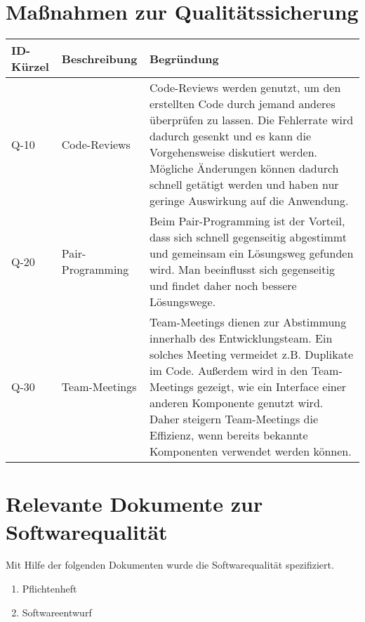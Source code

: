 \section{Maßnahmen zur Qualitätssicherung}
\begin{tabularx}{\textwidth}{|l|X|X|}
    \toprule
    \textbf{ID-Kürzel} & \textbf{Beschreibung} & \textbf{Begründung}\\
    \midrule
    \endhead
    \hline
    \caption{Qualitätssicherung}    
    \endfoot    
    Q-10 & Code-Reviews & Code-Reviews werden genutzt, um den erstellten Code durch jemand anderes überprüfen zu lassen. Die Fehlerrate wird 		dadurch gesenkt und es kann die Vorgehensweise diskutiert werden. Mögliche Änderungen können dadurch schnell getätigt werden und haben nur 		geringe Auswirkung auf die Anwendung.  \\ \hline
    Q-20 & Pair-Programming & Beim Pair-Programming ist der Vorteil, dass sich schnell gegenseitig abgestimmt und gemeinsam ein Lösungsweg  		gefunden wird. Man beeinflusst sich gegenseitig und findet daher noch bessere Lösungswege.\\ \hline
    Q-30 & Team-Meetings & Team-Meetings dienen zur Abstimmung innerhalb des Entwicklungsteam. Ein solches Meeting vermeidet z.B. Duplikate im 		Code. Außerdem wird in den Team-Meetings gezeigt, wie ein Interface einer anderen Komponente genutzt wird. Daher steigern Team-Meetings die 	Effizienz, wenn bereits bekannte Komponenten verwendet werden können.\\  
\end{tabularx}

\section{Relevante Dokumente zur Softwarequalität}


Mit Hilfe der folgenden Dokumenten wurde die Softwarequalität spezifiziert.
\begin{enumerate}
\item Pflichtenheft
\item Softwareentwurf


\end{enumerate}






